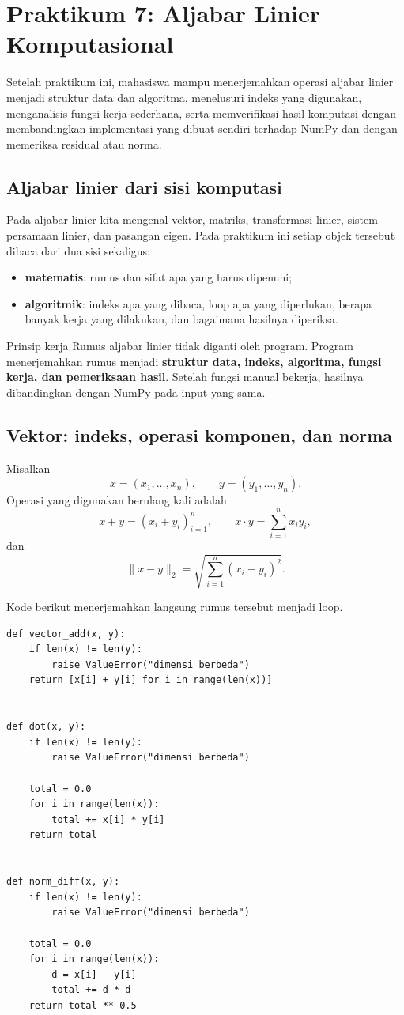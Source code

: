 \documentclass[11pt,a4paper]{report}
\begin{document}
\chapter{Praktikum 7: Aljabar Linier Komputasional}
\begin{tujuanbox}
Setelah praktikum ini, mahasiswa mampu menerjemahkan operasi aljabar linier menjadi struktur data dan algoritma, menelusuri indeks yang digunakan, menganalisis fungsi kerja sederhana, serta memverifikasi hasil komputasi dengan membandingkan implementasi yang dibuat sendiri terhadap NumPy dan dengan memeriksa residual atau norma.
\end{tujuanbox}

\section{Aljabar linier dari sisi komputasi}
Pada aljabar linier kita mengenal vektor, matriks, transformasi linier, sistem persamaan linier, dan pasangan eigen. Pada praktikum ini setiap objek tersebut dibaca dari dua sisi sekaligus:
\begin{itemize}
  \item \textbf{matematis}: rumus dan sifat apa yang harus dipenuhi;
  \item \textbf{algoritmik}: indeks apa yang dibaca, loop apa yang diperlukan, berapa banyak kerja yang dilakukan, dan bagaimana hasilnya diperiksa.
\end{itemize}

\begin{idebox}{Prinsip kerja}
Rumus aljabar linier tidak diganti oleh program. Program menerjemahkan rumus menjadi \textbf{struktur data, indeks, algoritma, fungsi kerja, dan pemeriksaan hasil}. Setelah fungsi manual bekerja, hasilnya dibandingkan dengan NumPy pada input yang sama.
\end{idebox}

\section{Vektor: indeks, operasi komponen, dan norma}
Misalkan
\[
x=(x_1,\ldots,x_n),\qquad y=(y_1,\ldots,y_n).
\]
Operasi yang digunakan berulang kali adalah
\[
x+y=(x_i+y_i)_{i=1}^n,\qquad
x\cdot y=\sum_{i=1}^{n}x_i y_i,
\]
dan
\[
\|x-y\|_2=\sqrt{\sum_{i=1}^{n}(x_i-y_i)^2}.
\]

Kode berikut menerjemahkan langsung rumus tersebut menjadi loop.
\begin{lstlisting}
def vector_add(x, y):
    if len(x) != len(y):
        raise ValueError("dimensi berbeda")
    return [x[i] + y[i] for i in range(len(x))]


def dot(x, y):
    if len(x) != len(y):
        raise ValueError("dimensi berbeda")

    total = 0.0
    for i in range(len(x)):
        total += x[i] * y[i]
    return total


def norm_diff(x, y):
    if len(x) != len(y):
        raise ValueError("dimensi berbeda")

    total = 0.0
    for i in range(len(x)):
        d = x[i] - y[i]
        total += d * d
    return total ** 0.5
\end{lstlisting}
\end{document}
